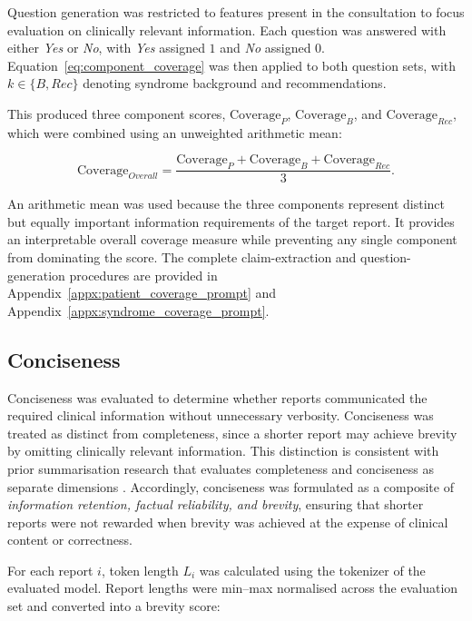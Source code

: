 \documentclass[ %
                    author={Aman Kumar Singh},
                supervisor={Dr. Edwin Simpson},
                    degree={MSc},
                     title={Quality-Aware Knowledge Distillation of Large Language Models for Efficient Personalised Clinical Report Generation},
                  subtitle={},
                      type={},
                      year={2021}]{dissertation}
\begin{document}
Question generation was restricted to features present in the consultation
to focus evaluation on clinically relevant information. Each question was
answered with either \textit{Yes} or \textit{No}, with \textit{Yes}
assigned $1$ and \textit{No} assigned $0$. Equation~\ref{eq:component_coverage}
was then applied to both question sets, with $k\in\{B,Rec\}$ denoting
syndrome background and recommendations.

This produced three component scores,
$\mathrm{Coverage}_{P}$, $\mathrm{Coverage}_{B}$, and
$\mathrm{Coverage}_{Rec}$, which were combined using an unweighted
arithmetic mean:

\begin{equation}
\mathrm{Coverage}_{Overall}
=
\frac{
\mathrm{Coverage}_{P}
+
\mathrm{Coverage}_{B}
+
\mathrm{Coverage}_{Rec}
}{3}.
\label{eq:overall_coverage}
\end{equation}

An arithmetic mean was used because the three components represent distinct
but equally important information requirements of the target report. It
provides an interpretable overall coverage measure while preventing any
single component from dominating the score. The complete claim-extraction and question-generation
procedures are provided in Appendix~\ref{appx:patient_coverage_prompt} and
Appendix~\ref{appx:syndrome_coverage_prompt}.


\subsection{Conciseness}
\label{sec:conciseness}

Conciseness was evaluated to determine whether reports communicated the
required clinical information without unnecessary verbosity. Conciseness
was treated as distinct from completeness, since a shorter report may
achieve brevity by omitting clinically relevant information. This
distinction is consistent with prior summarisation research that evaluates
completeness and conciseness as separate dimensions
\cite{song_finesure_2024}. Accordingly, conciseness was formulated as a
composite of \textit{information retention, factual reliability, and
brevity}, ensuring that shorter reports were not rewarded when brevity was
achieved at the expense of clinical content or correctness.

For each report $i$, token length $L_i$ was calculated using the tokenizer
of the evaluated model. Report lengths were min--max normalised across the
evaluation set and converted into a brevity score:
\end{document}
